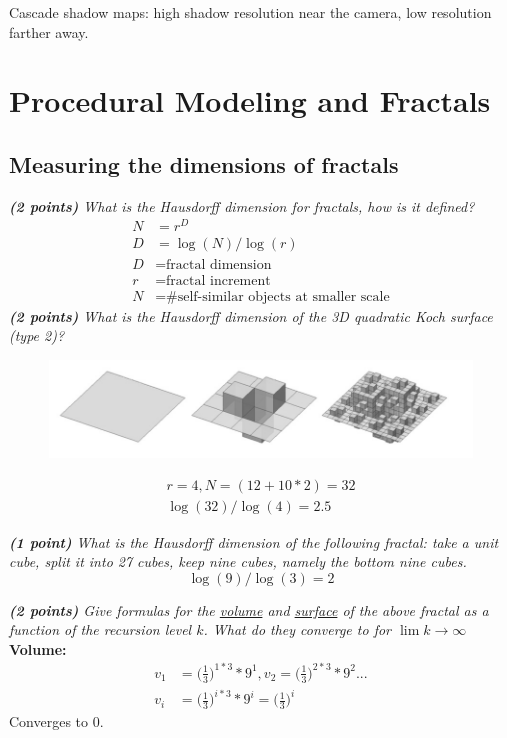 \documentclass[a4paper,10pt]{article}
\begin{document}
Cascade shadow maps: high shadow resolution near the camera, low resolution farther away.
\section{Procedural Modeling and Fractals}
\subsection{Measuring the dimensions of fractals}
\textit{\textbf{(2 points)} What is the Hausdorff dimension for fractals, how is it defined?}
\[\begin{aligned}
N&=r^D\\
D&=\log(N)/\log(r)\\
D&=\text{fractal dimension}\\
r&=\text{fractal increment}\\
N&=\text{\# self-similar objects at smaller scale}
\end{aligned}\]
\textit{\textbf{(2 points)} What is the Hausdorff dimension of the 3D quadratic Koch surface (type 2)?}\\

\begin{figure}[H]
	\centering
	\includegraphics[width=.7\textwidth]{5-koch}
\end{figure}
\[\begin{aligned}
r=4,N=(12+10*2)=32\\
\log(32)/\log(4)=2.5
\end{aligned}\]

\textit{\textbf{(1 point)} What is the Hausdorff dimension of the following fractal: take a unit cube, split it into 27 cubes, keep nine cubes, namely the bottom nine cubes.
}\\

\[\log(9)/\log(3)=2\]

\textit{\textbf{(2 points)} Give formulas for the \underline{volume} and \underline{surface} of the above fractal as a function of the recursion level $k$. What do they converge to for $\lim k\rightarrow\infty$}\\

\textbf{Volume:}
\[\begin{aligned}
v_1&=\Big(\frac{1}{3}\Big)^{1*3}*9^1,v_2=\Big(\frac{1}{3}\Big)^{2*3}*9^2...\\
v_i&=\Big(\frac{1}{3}\Big)^{i*3}*9^i=\Big(\frac{1}{3}\Big)^{i}
\end{aligned}\]
Converges to 0.\\
\end{document}
